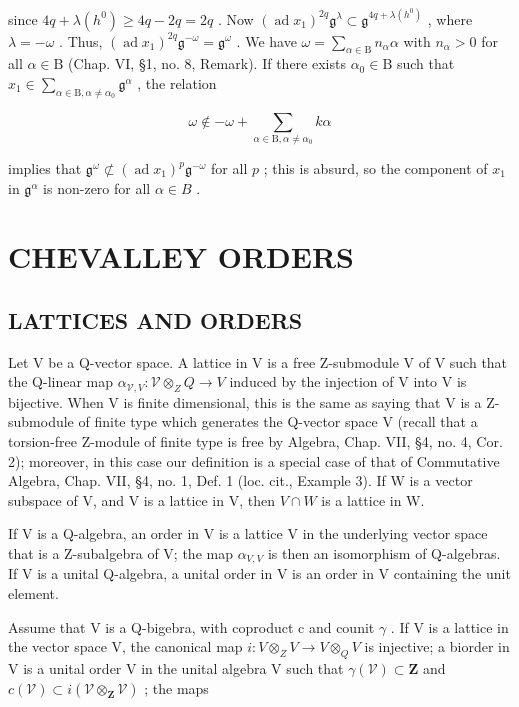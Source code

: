 since \(4q + \lambda(h^0) \geq 4q - 2q = 2q\) . Now \((\operatorname{ad} x_1)^{2q} \mathfrak{g}^\lambda \subset \mathfrak{g}^{4q + \lambda(h^0)}\) , where \(\lambda = -\omega\) . Thus, \((\operatorname{ad} x_1)^{2q} \mathfrak{g}^{-\omega} = \mathfrak{g}^\omega\) . We have \(\omega = \sum_{\alpha \in \mathrm{B}} n_\alpha \alpha\) with \(n_\alpha > 0\) for all \(\alpha \in \mathrm{B}\) (Chap. VI, §1, no. 8, Remark). If there exists \(\alpha_0 \in \mathrm{B}\) such that \(x_1 \in \sum_{\alpha \in \mathrm{B}, \alpha \neq \alpha_0} \mathfrak{g}^\alpha\) , the relation

\[
\omega \notin - \omega + \sum_ {\alpha \in \mathrm{B}, \alpha \neq \alpha_ {0}} k \alpha
\]

implies that \(\mathfrak{g}^{\omega} \not\subset (\operatorname{ad} x_1)^p \mathfrak{g}^{-\omega}\) for all \(p\) ; this is absurd, so the component of \(x_1\) in \(\mathfrak{g}^{\alpha}\) is non-zero for all \(\alpha \in B\) .

\section{CHEVALLEY ORDERS}

\subsection{LATTICES AND ORDERS}

Let V be a Q-vector space. A lattice in V is a free Z-submodule V of V such that the Q-linear map \(\alpha_{\mathcal{V},V} : \mathcal{V} \otimes_{Z} Q \to V\) induced by the injection of V into V is bijective. When V is finite dimensional, this is the same as saying that V is a Z-submodule of finite type which generates the Q-vector space V (recall that a torsion-free Z-module of finite type is free by Algebra, Chap. VII, §4, no. 4, Cor. 2); moreover, in this case our definition is a special case of that of Commutative Algebra, Chap. VII, §4, no. 1, Def. 1 (loc. cit., Example 3). If W is a vector subspace of V, and V is a lattice in V, then \(V \cap W\) is a lattice in W.

If V is a Q-algebra, an order in V is a lattice V in the underlying vector space that is a Z-subalgebra of V; the map \(\alpha_{V,V}\) is then an isomorphism of Q-algebras. If V is a unital Q-algebra, a unital order in V is an order in V containing the unit element.

Assume that V is a Q-bigebra, with coproduct c and counit \(\gamma\) . If V is a lattice in the vector space V, the canonical map \(i: V \otimes_{Z} V \to V \otimes_{Q} V\) is injective; a biorder in V is a unital order V in the unital algebra V such that \(\gamma(\mathcal{V}) \subset \mathbf{Z}\) and \(c(\mathcal{V}) \subset i(\mathcal{V} \otimes_{\mathbf{Z}} \mathcal{V})\) ; the maps

